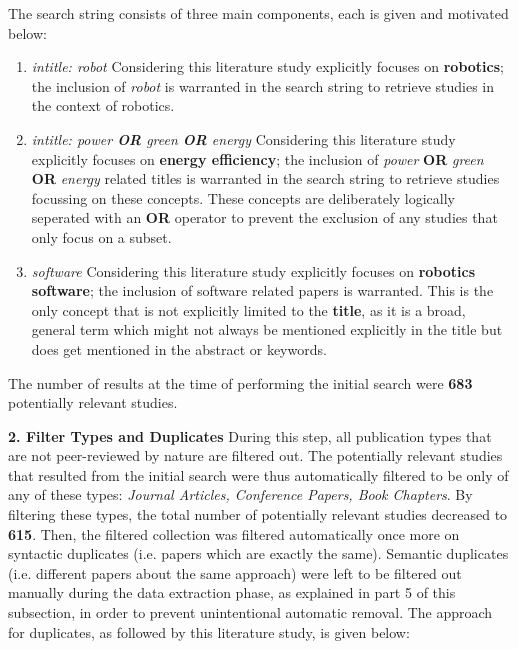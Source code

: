The search string consists of three main components, each is given and motivated below:
\begin{enumerate}
    \item \textit{intitle: robot} \newline
    Considering this literature study explicitly focuses on \textbf{robotics}; 
    the inclusion of \textit{robot} is warranted in the search string to retrieve studies in the context of robotics.

    \item \textit{intitle: power \textbf{OR} green \textbf{OR} energy} \newline 
    Considering this literature study explicitly focuses on \textbf{energy efficiency};
    the inclusion of \textit{power} \textbf{OR} \textit{green} \textbf{OR} \textit{energy} related titles is warranted in the search string to retrieve studies focussing on 
    these concepts.
    These concepts are deliberately logically seperated with an \textbf{OR} operator to prevent the exclusion of any studies that only focus on a subset.

    \item \textit{software} \newline
    Considering this literature study explicitly focuses on \textbf{robotics software};
    the inclusion of software related papers is warranted.
    This is the only concept that is not explicitly limited to the \textbf{title}, as it is a broad, general term which might not always be mentioned
    explicitly in the title but does get mentioned in the abstract or keywords.
    
\end{enumerate}
The number of results at the time of performing the initial search were \textbf{683} potentially relevant studies.

\vspace{5mm}

\noindent\textbf{2. Filter Types and Duplicates}
During this step, all publication types that are not peer-reviewed by nature are filtered out. 
The potentially relevant studies that resulted from the initial search were thus automatically filtered to be only of any of these types: 
\textit{Journal Articles, Conference Papers, Book Chapters}.
By filtering these types, the total number of potentially relevant studies decreased to \textbf{615}. 
Then, the filtered collection was filtered automatically once more on 
syntactic duplicates (i.e. papers which are exactly the same). 
Semantic duplicates (i.e. different papers about the same approach) were left to be filtered out manually during the data extraction phase, 
as explained in part 5 of this subsection, in order to prevent unintentional automatic removal. 
The approach for duplicates, as followed by this literature study, is given below:


